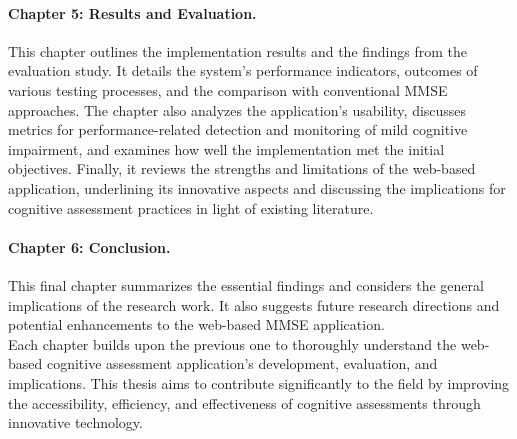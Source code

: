 \paragraph{Chapter 5: Results and Evaluation.} This chapter outlines the implementation results and the findings from the evaluation study. It details the system's performance indicators, outcomes of various testing processes, and the comparison with conventional MMSE approaches. The chapter also analyzes the application's usability, discusses metrics for performance-related detection and monitoring of mild cognitive impairment, and examines how well the implementation met the initial objectives. Finally, it reviews the strengths and limitations of the web-based application, underlining its innovative aspects and discussing the implications for cognitive assessment practices in light of existing literature.

\paragraph{Chapter 6: Conclusion.} This final chapter summarizes the essential findings and considers the general implications of the research work. It also suggests future research directions and potential enhancements to the web-based MMSE application.\\

Each chapter builds upon the previous one to thoroughly understand the web-based cognitive assessment application's development, evaluation, and implications. This thesis aims to contribute significantly to the field by improving the accessibility, efficiency, and effectiveness of cognitive assessments through innovative technology.